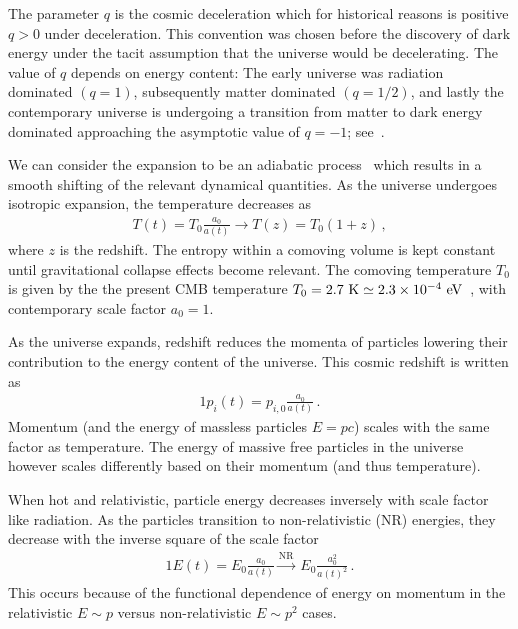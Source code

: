 The parameter $q$ is the cosmic deceleration which for historical reasons is positive $q>0$ under deceleration. This convention was chosen before the discovery of dark energy under the tacit assumption that the universe would be decelerating. The value of $q$ depends on energy content: The early universe was radiation dominated $(q = 1)$, subsequently matter dominated $(q = 1/2)$, and lastly the contemporary universe is undergoing a transition from matter to dark energy dominated approaching the asymptotic value of $q = -1$; see~\cite{Rafelski:2013yka}.

We can consider the expansion to be an adiabatic process~\cite{Abdalla:2022yfr} which results in a smooth shifting of the relevant dynamical quantities. As the universe undergoes isotropic expansion, the temperature decreases as 
\begin{gather}
 \label{tscale}
 T(t)=T_{0}\frac{a_{0}}{a(t)}\rightarrow T(z)=T_{0}(1+z)\,,
\end{gather}
where $z$ is the redshift. The entropy within a comoving volume is kept constant until gravitational collapse effects become relevant. The comoving temperature $T_{0}$ is given by the the present CMB temperature $T_{0}=2.7{\rm\ K}\simeq2.3\times10^{-4}\eV$~\cite{Planck:2018vyg}, with contemporary scale factor $a_{0}=1$.

As the universe expands, redshift reduces the momenta of particles lowering their contribution to the energy content of the universe. This cosmic redshift is written as
\begin{alignat}{1}
  \label{Redshift} p_{i}(t) = p_{i,0}\frac{a_{0}}{a(t)}\,.
\end{alignat}
Momentum (and the energy of massless particles $E=pc$) scales with the same factor as temperature. The energy of massive free particles in the universe however scales differently based on their momentum (and thus temperature).

When hot and relativistic, particle energy decreases inversely with scale factor like radiation. As the particles transition to non-relativistic (NR) energies, they decrease with the inverse square of the scale factor
\begin{alignat}{1}
    \label{EScale} E(t) = E_{0}\frac{a_{0}}{a(t)}\xrightarrow{\mathrm{NR}}\  E_{0}\frac{a_{0}^{2}}{a(t)^{2}}\,.
\end{alignat}
This occurs because of the functional dependence of energy on momentum in the relativistic $E\sim p$ versus non-relativistic $E\sim p^{2}$ cases.

